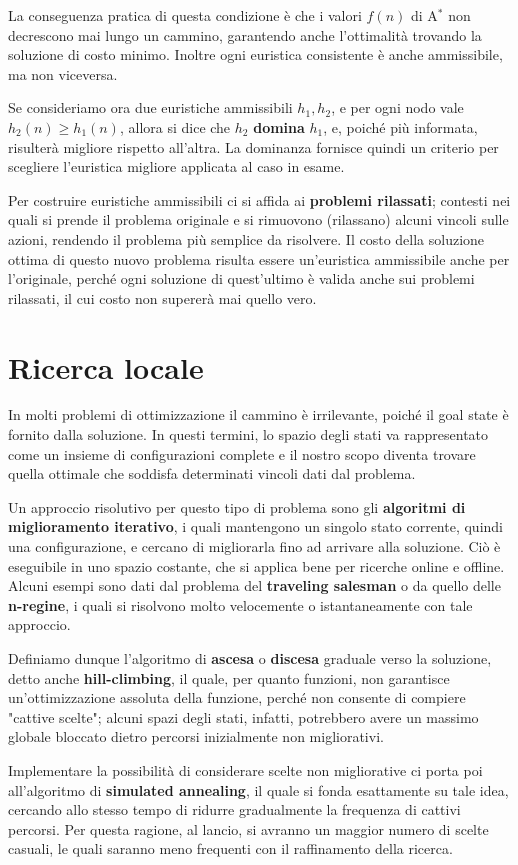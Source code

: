 \noindent La conseguenza pratica di questa condizione è che i valori $f(n)$ di A$^*$ non decrescono mai lungo un cammino, garantendo anche l'ottimalità
trovando la soluzione di costo minimo. Inoltre ogni euristica consistente è anche ammissibile, ma non viceversa.\par
Se consideriamo ora due euristiche ammissibili $h_1, h_2$, e per ogni nodo vale $h_2(n) \geq h_1(n)$, allora si dice che $h_2$ \textbf{domina} $h_1$, e,
poiché più informata, risulterà migliore rispetto all'altra. La dominanza fornisce quindi un criterio per scegliere l'euristica migliore applicata al
caso in esame.\par
Per costruire euristiche ammissibili ci si affida ai \textbf{problemi rilassati}; contesti nei quali si prende il problema originale e si rimuovono
(rilassano) alcuni vincoli sulle azioni, rendendo il problema più semplice da risolvere. Il costo della soluzione ottima di questo nuovo problema
risulta essere un'euristica ammissibile anche per l'originale, perché ogni soluzione di quest'ultimo è valida anche sui problemi rilassati, il cui costo
non supererà mai quello vero.

%

\section{Ricerca locale}
In molti problemi di ottimizzazione il cammino è irrilevante, poiché il goal state è fornito dalla soluzione. In questi termini, lo spazio degli stati
va rappresentato come un insieme di configurazioni complete e il nostro scopo diventa trovare quella ottimale che soddisfa determinati vincoli dati dal
problema.\par
Un approccio risolutivo per questo tipo di problema sono gli \textbf{algoritmi di miglioramento iterativo}, i quali mantengono un singolo stato corrente,
quindi una configurazione, e cercano di migliorarla fino ad arrivare alla soluzione. Ciò è eseguibile in uno spazio costante, che si applica bene per
ricerche online e offline. Alcuni esempi sono dati dal problema del \textbf{traveling salesman} o da quello delle \textbf{n-regine}, i quali si
risolvono molto velocemente o istantaneamente con tale approccio.\par
Definiamo dunque l'algoritmo di \textbf{ascesa} o \textbf{discesa} graduale verso la soluzione, detto anche \textbf{hill-climbing}, il quale, per quanto
funzioni, non garantisce un'ottimizzazione assoluta della funzione, perché non consente di compiere "cattive scelte"; alcuni spazi degli stati, infatti,
potrebbero avere un massimo globale bloccato dietro percorsi inizialmente non migliorativi.\par
Implementare la possibilità di considerare scelte non migliorative ci porta poi all'algoritmo di \textbf{simulated annealing}, il quale si fonda
esattamente su tale idea, cercando allo stesso tempo di ridurre gradualmente la frequenza di cattivi percorsi. Per questa ragione, al lancio, si
avranno un maggior numero di scelte casuali, le quali saranno meno frequenti con il raffinamento della ricerca.


